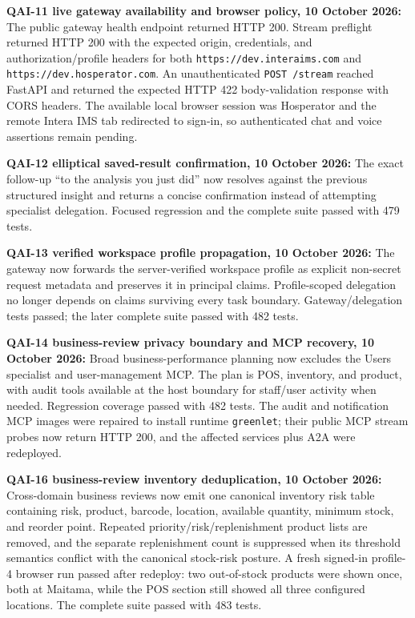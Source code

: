\documentclass[10pt]{article}
\begin{document}
\colorbox{mist}{\parbox{0.96\textwidth}{\textbf{QAI-11 live gateway availability and browser policy, 10 October 2026:} The public gateway health endpoint returned HTTP 200. Stream preflight returned HTTP 200 with the expected origin, credentials, and authorization/profile headers for both \texttt{https://dev.interaims.com} and \texttt{https://dev.hosperator.com}. An unauthenticated \texttt{POST /stream} reached FastAPI and returned the expected HTTP 422 body-validation response with CORS headers. The available local browser session was Hosperator and the remote Intera IMS tab redirected to sign-in, so authenticated chat and voice assertions remain pending.}}

\colorbox{mist}{\parbox{0.96\textwidth}{\textbf{QAI-12 elliptical saved-result confirmation, 10 October 2026:} The exact follow-up ``to the analysis you just did'' now resolves against the previous structured insight and returns a concise confirmation instead of attempting specialist delegation. Focused regression and the complete suite passed with 479 tests.}}

\colorbox{mist}{\parbox{0.96\textwidth}{\textbf{QAI-13 verified workspace profile propagation, 10 October 2026:} The gateway now forwards the server-verified workspace profile as explicit non-secret request metadata and preserves it in principal claims. Profile-scoped delegation no longer depends on claims surviving every task boundary. Gateway/delegation tests passed; the later complete suite passed with 482 tests.}}

\colorbox{mist}{\parbox{0.96\textwidth}{\textbf{QAI-14 business-review privacy boundary and MCP recovery, 10 October 2026:} Broad business-performance planning now excludes the Users specialist and user-management MCP. The plan is POS, inventory, and product, with audit tools available at the host boundary for staff/user activity when needed. Regression coverage passed with 482 tests. The audit and notification MCP images were repaired to install runtime \texttt{greenlet}; their public MCP stream probes now return HTTP 200, and the affected services plus A2A were redeployed.}}

\colorbox{mist}{\parbox{0.96\textwidth}{\textbf{QAI-16 business-review inventory deduplication, 10 October 2026:} Cross-domain business reviews now emit one canonical inventory risk table containing risk, product, barcode, location, available quantity, minimum stock, and reorder point. Repeated priority/risk/replenishment product lists are removed, and the separate replenishment count is suppressed when its threshold semantics conflict with the canonical stock-risk posture. A fresh signed-in profile-4 browser run passed after redeploy: two out-of-stock products were shown once, both at Maitama, while the POS section still showed all three configured locations. The complete suite passed with 483 tests.}}
\end{document}

